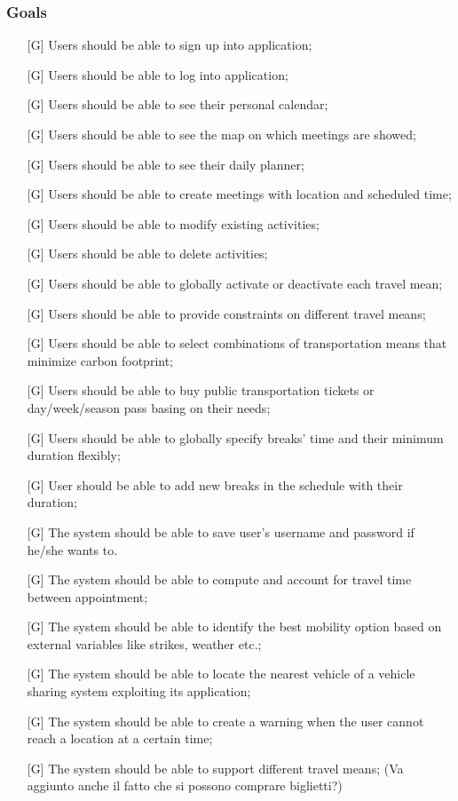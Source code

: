 \documentclass[12pt,titlepage]{article}
\begin{document}
\subsubsection{Goals}\label{RASD}
\begin{itemize}


\item [{[G\ped{1}]}]	Users should be able to sign up into application;
\item [{[G\ped{2}]}]		Users should be able to log into application;
\item [{[G\ped{3}]}]		Users should be able to see their personal calendar;
\item [{[G\ped{4}]}]		Users should be able to see the map on which meetings are showed;
\item [{[G\ped{5}]}]		Users should be able to see their daily planner;
\item [{[G\ped{6}]}]		Users should be able to create meetings with location and scheduled time;
\item [{[G\ped{7}]}]		Users should be able to modify existing activities;
\item [{[G\ped{8}]}]		Users should be able to delete activities;
\item [{[G\ped{9}]}]		Users should be able to globally activate or deactivate each travel mean;
\item [{[G\ped{10}]}]		Users should be able to provide constraints on different travel means;
\item [{[G\ped{11}]}]		Users should be able to select combinations of transportation means that minimize carbon footprint;
\item [{[G\ped{12}]}]		Users should be able to buy public transportation tickets or day/week/season pass basing on their needs;
\item [{[G\ped{13}]}]		Users should be able to globally specify breaks' time and their minimum duration flexibly;
\item [{[G\ped{14}]}]		User should be able to add new breaks in the schedule with their duration;
\item [{[G\ped{15}]}]	The system should be able to save user's username and password if he/she wants to.
\item [{[G\ped{16}]}]		The system should be able to compute and account for travel time between appointment;
\item [{[G\ped{17}]}]		The system should be able to identify the best mobility option based on external variables like strikes, weather etc.;
\item [{[G\ped{18}]}]		The system should be able to locate the nearest vehicle of a vehicle sharing system exploiting its application;
\item [{[G\ped{19}]}]		The system should be able to create a warning when the user cannot reach a location at a certain time;
\item [{[G\ped{20}]}]		The system should be able to support different travel means;
 (Va aggiunto anche il fatto che si possono comprare biglietti?)
 \end{itemize}
\end{document}
